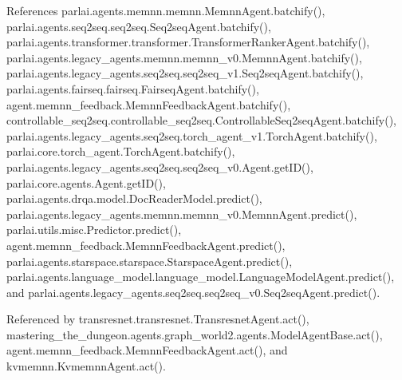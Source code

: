 References parlai.\+agents.\+memnn.\+memnn.\+Memnn\+Agent.\+batchify(), parlai.\+agents.\+seq2seq.\+seq2seq.\+Seq2seq\+Agent.\+batchify(), parlai.\+agents.\+transformer.\+transformer.\+Transformer\+Ranker\+Agent.\+batchify(), parlai.\+agents.\+legacy\+\_\+agents.\+memnn.\+memnn\+\_\+v0.\+Memnn\+Agent.\+batchify(), parlai.\+agents.\+legacy\+\_\+agents.\+seq2seq.\+seq2seq\+\_\+v1.\+Seq2seq\+Agent.\+batchify(), parlai.\+agents.\+fairseq.\+fairseq.\+Fairseq\+Agent.\+batchify(), agent.\+memnn\+\_\+feedback.\+Memnn\+Feedback\+Agent.\+batchify(), controllable\+\_\+seq2seq.\+controllable\+\_\+seq2seq.\+Controllable\+Seq2seq\+Agent.\+batchify(), parlai.\+agents.\+legacy\+\_\+agents.\+seq2seq.\+torch\+\_\+agent\+\_\+v1.\+Torch\+Agent.\+batchify(), parlai.\+core.\+torch\+\_\+agent.\+Torch\+Agent.\+batchify(), parlai.\+agents.\+legacy\+\_\+agents.\+seq2seq.\+seq2seq\+\_\+v0.\+Agent.\+get\+I\+D(), parlai.\+core.\+agents.\+Agent.\+get\+I\+D(), parlai.\+agents.\+drqa.\+model.\+Doc\+Reader\+Model.\+predict(), parlai.\+agents.\+legacy\+\_\+agents.\+memnn.\+memnn\+\_\+v0.\+Memnn\+Agent.\+predict(), parlai.\+utils.\+misc.\+Predictor.\+predict(), agent.\+memnn\+\_\+feedback.\+Memnn\+Feedback\+Agent.\+predict(), parlai.\+agents.\+starspace.\+starspace.\+Starspace\+Agent.\+predict(), parlai.\+agents.\+language\+\_\+model.\+language\+\_\+model.\+Language\+Model\+Agent.\+predict(), and parlai.\+agents.\+legacy\+\_\+agents.\+seq2seq.\+seq2seq\+\_\+v0.\+Seq2seq\+Agent.\+predict().



Referenced by transresnet.\+transresnet.\+Transresnet\+Agent.\+act(), mastering\+\_\+the\+\_\+dungeon.\+agents.\+graph\+\_\+world2.\+agents.\+Model\+Agent\+Base.\+act(), agent.\+memnn\+\_\+feedback.\+Memnn\+Feedback\+Agent.\+act(), and kvmemnn.\+Kvmemnn\+Agent.\+act().

